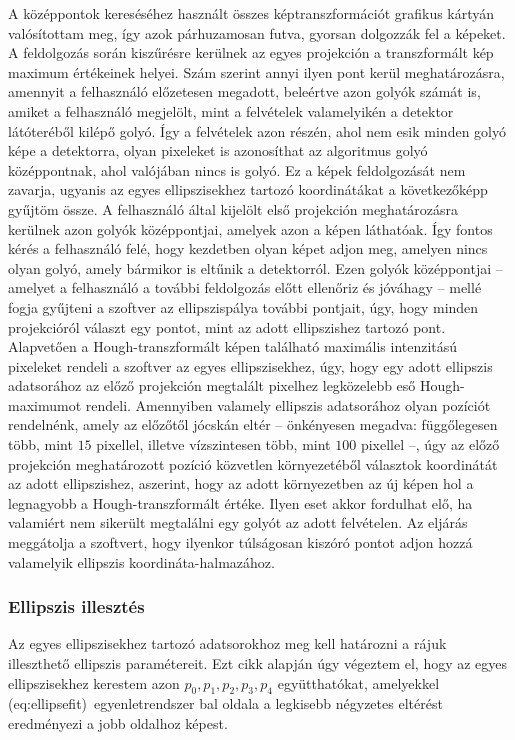 \documentclass[a4paper,12pt]{article}
\begin{document}
A középpontok kereséséhez használt összes képtranszformációt grafikus kártyán valósítottam meg, így azok párhuzamosan futva, gyorsan dolgozzák fel a képeket. A feldolgozás során kiszűrésre kerülnek az egyes projekción a transzformált kép maximum értékeinek helyei. Szám szerint annyi ilyen pont kerül meghatározásra, amennyit a felhasználó előzetesen megadott, beleértve azon golyók számát is, amiket a felhasználó megjelölt, mint a felvételek valamelyikén a detektor látóteréből kilépő golyó. Így a felvételek azon részén, ahol nem esik minden golyó képe a detektorra,  olyan pixeleket is azonosíthat az algoritmus golyó középpontnak, ahol valójában nincs is golyó. Ez a képek feldolgozását nem zavarja, ugyanis az egyes ellipszisekhez tartozó koordinátákat a következőképp gyűjtöm össze. A felhasználó által kijelölt első projekción meghatározásra kerülnek azon golyók középpontjai, amelyek azon a képen láthatóak. Így fontos kérés a felhasználó felé, hogy kezdetben olyan képet adjon meg, amelyen nincs olyan golyó, amely bármikor is eltűnik a detektorról. Ezen golyók középpontjai -- amelyet a felhasználó a további feldolgozás előtt ellenőriz és jóváhagy -- mellé fogja gyűjteni a szoftver az ellipszispálya további pontjait, úgy, hogy minden projekcióról választ egy pontot, mint az adott ellipszishez tartozó pont. Alapvetően a Hough-transzformált képen található  maximális intenzitású pixeleket rendeli a szoftver az egyes ellipszisekhez, úgy, hogy egy adott ellipszis adatsorához az előző projekción megtalált pixelhez legközelebb eső Hough-maximumot rendeli. Amennyiben valamely ellipszis adatsorához olyan pozíciót rendelnénk, amely az előzőtől jócskán eltér -- önkényesen megadva:  függőlegesen több, mint $15$ pixellel, illetve vízszintesen több, mint $100$ pixellel --, úgy az előző projekción meghatározott pozíció közvetlen környezetéből választok koordinátát az adott ellipszishez, aszerint, hogy az adott környezetben az új képen hol a legnagyobb a Hough-transzformált értéke. Ilyen eset akkor fordulhat elő, ha valamiért nem sikerült megtalálni egy golyót az adott felvételen. Az eljárás meggátolja a szoftvert, hogy ilyenkor túlságosan kiszóró pontot adjon hozzá valamelyik ellipszis koordináta-halmazához.




\subsubsection{Ellipszis illesztés}


Az egyes ellipszisekhez tartozó adatsorokhoz meg kell határozni a rájuk illeszthető ellipszis paramétereit. Ezt  cikk alapján úgy végeztem el, hogy az egyes ellipszisekhez kerestem azon $p_0,p_1,p_2,p_3,p_4$ együtthatókat, amelyekkel \aref({eq:ellipsefit})~egyenletrendszer bal oldala a legkisebb négyzetes eltérést eredményezi a jobb oldalhoz képest. 
\end{document}
